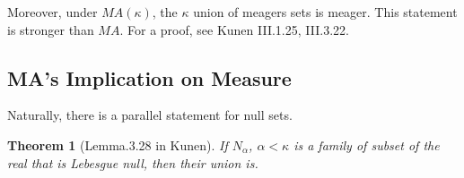 \documentclass{article}
\newtheorem{definition}{Definition}
\newtheorem{lemma}{Lemma}
\newtheorem{theorem}{Theorem}
\begin{document}
Moreover, under $MA(\kappa)$, the $\kappa$ union of meagers sets is meager. This statement is stronger than $MA$. For a proof, see Kunen III.1.25, III.3.22.





    

\subsection{MA's Implication on Measure}

Naturally, there is a parallel statement for null sets.

\begin{theorem}[Lemma.3.28 in Kunen]
    If $N_\alpha$, $\alpha<\kappa$ is a family of subset of the real that is Lebesgue null, then their union is.
\end{theorem}
\end{document}
